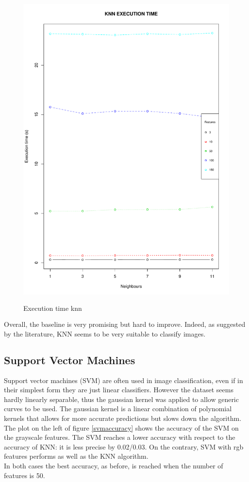 \documentclass{article}
\begin{document}
\begin{figure}[H]
\begin{adjustwidth}{-4cm}{-4cm}
{    \includegraphics[scale=0.3]{../knn_time_rgb.pdf}  
     }
     \centering
     \caption{Execution time knn}
      \end{adjustwidth}
   \end{figure}
   
\noindent Overall, the baseline is very promising but hard to improve. Indeed, as suggested by the literature, KNN seems to be very suitable to classify images.

\subsection{Support Vector Machines}
Support vector machines (SVM) are often used in image classification, even if in their simplest form they are just linear classifiers. However the dataset seems  hardly linearly separable, thus the gaussian kernel was applied to allow generic curves to be used. The gaussian kernel is a linear combination of polynomial kernels that allows for more accurate predictions but slows down the algorithm.\\
The plot on the left of figure \ref{svmaccuracy} shows the accuracy of the SVM on the grayscale features. The SVM reaches a lower accuracy with respect to the accuracy of KNN: it is less precise by 0.02/0.03. On the contrary, SVM with rgb features performs as well as the KNN algorithm.\\
In both cases the best accuracy, as before, is reached when the number of features is 50.
\end{document}
